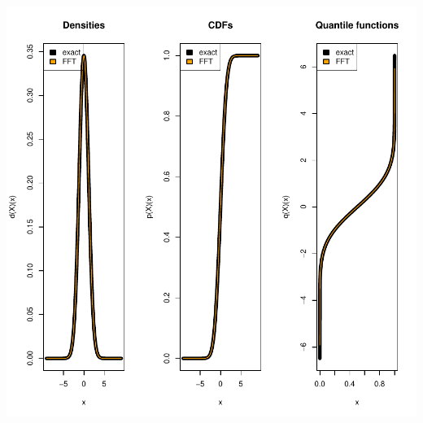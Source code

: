 \documentclass[11pt]{article}
\begin{document}
\includegraphics{distr-StationaryRegressorDistr}
\end{document}
